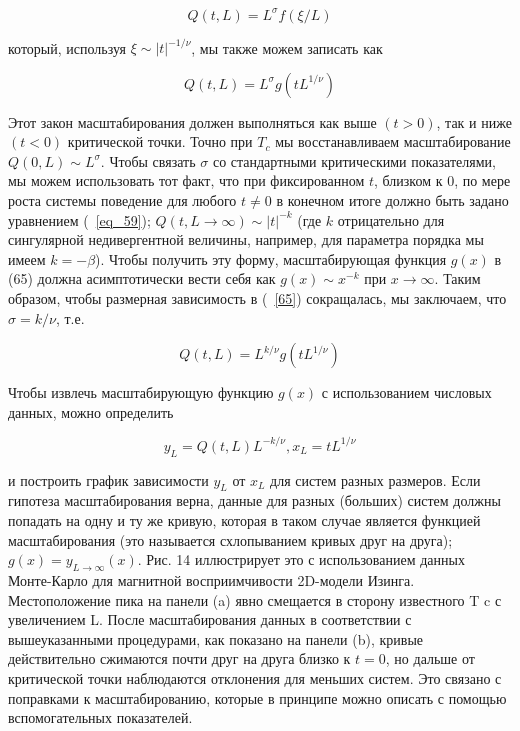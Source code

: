 \documentclass[11pt]{article}
\begin{document}
\begin{equation}
Q(t,L) = L^\sigma f(\xi/L)
\label{eq_64}
\end{equation}

который, используя $\xi \sim | t |^{ −1 / \nu }$, мы также можем записать как

\begin{equation}
Q(t,L) = L^\sigma g(tL^{1/\nu })
\label{eq_65}
\end{equation}

Этот закон масштабирования должен выполняться как выше $(t> 0)$, так и ниже $(t <0)$ критической точки. Точно при $T_c$ мы восстанавливаем масштабирование $Q(0, L) \sim L^\sigma$. Чтобы связать $\sigma$ со стандартными критическими показателями, мы можем использовать тот факт, что при фиксированном $t$, близком к 0, по мере роста системы поведение для любого $t \ne 0$ в конечном итоге должно быть задано уравнением (~\ref{eq_59}); $Q (t, L → ∞) \sim | t |^{-k}$ (где $k$ отрицательно для сингулярной недивергентной величины, например, для параметра порядка мы имеем $k = -\beta $). Чтобы получить эту форму, масштабирующая функция $g (x)$ в (65) должна асимптотически вести себя как $g(x) \sim x^{-k}$ при $x → ∞$. Таким образом, чтобы размерная зависимость в (~\ref{65}) сокращалась, мы заключаем, что $\sigma = k / \nu $, т.е.

\begin{equation}
Q(t,L) = L^{k/ \nu }g(tL^{1/\nu })
\label{eq_66}
\end{equation}

Чтобы извлечь масштабирующую функцию $g(x)$ с использованием числовых данных, можно определить

\begin{equation}
y_L = Q(t,L)L^{-k/\nu}, x_L=tL^{1/\nu }
\label{eq_66}
\end{equation}

и построить график зависимости $y_L$ от $x_L$ для систем разных размеров. Если гипотеза масштабирования верна, данные для разных (больших) систем должны попадать на одну и ту же кривую, которая в таком случае является функцией масштабирования (это называется схлопыванием кривых друг на друга); $g(x) = y_{ L → ∞}(x)$. Рис. 14 иллюстрирует это с использованием данных Монте-Карло для магнитной восприимчивости 2D-модели Изинга. Местоположение пика на панели (a) явно смещается в сторону известного T c с увеличением L. После масштабирования данных в соответствии с вышеуказанными процедурами, как показано на панели (b), кривые действительно сжимаются почти друг на друга близко к $t = 0$, но дальше от критической точки наблюдаются отклонения для меньших систем. Это связано с поправками к масштабированию, которые в принципе можно описать с помощью вспомогательных показателей.
\end{document}
